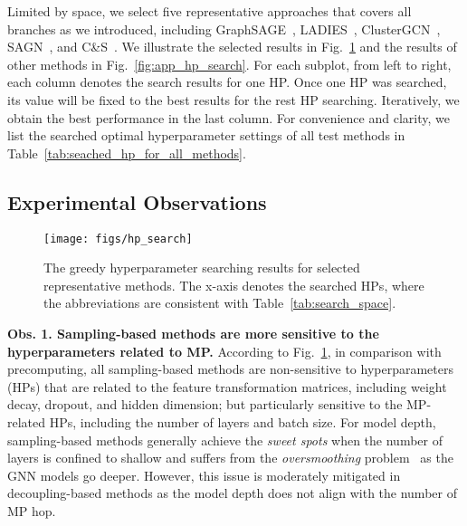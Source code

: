 \message{ !name(main.tex)}\documentclass{article}
\begin{document}
Limited by space, we select five representative approaches that covers all branches as we introduced, including GraphSAGE~\cite{hamilton2017inductive}, LADIES~\cite{zou2019layer}, ClusterGCN~\cite{chiang2019cluster}, SAGN~\cite{sun2021scalable}, and C\&S~\cite{huang2020combining}. We illustrate the selected results in Fig.~\ref{fig:hp_search} and the results of other methods in Fig.~\ref{fig:app_hp_search}. For each subplot, from left to right, each column denotes the search results for one HP. Once one HP was searched, its value will be fixed to the best results for the rest HP searching. Iteratively, we obtain the best performance in the last column. For convenience and clarity, we list the searched optimal hyperparameter settings of all test methods in Table~\ref{tab:seached_hp_for_all_methods}.

\vspace{-2mm}
\subsection{Experimental Observations}
\begin{figure}[!ht]
	\vspace{-4mm}
	\begin{center}
		\texttt{[image: figs/hp\_search]}
	\end{center}
	\caption{The greedy hyperparameter searching results for selected representative methods. The x-axis denotes the searched HPs, where the abbreviations are consistent with Table~\ref{tab:search_space}.}
	\label{fig:hp_search}
\end{figure}

\textbf{Obs. 1. Sampling-based methods are more sensitive to the hyperparameters related to MP.} According to Fig.~\ref{fig:hp_search}, in comparison with precomputing, all sampling-based methods are non-sensitive to hyperparameters (HPs) that are related to the feature transformation matrices, including weight decay, dropout, and hidden dimension; but particularly sensitive to the MP-related HPs, including the number of layers and batch size. For model depth, sampling-based methods generally achieve the \textit{sweet spots} when the number of layers is confined to shallow and suffers from the \textit{oversmoothing} problem~\cite{li2018deeper, chen2022bag, oono2020graph, zhou2020towards, zhou2021dirichlet} as the GNN models go deeper. However, this issue is moderately mitigated in decoupling-based methods as the model depth does not align with the number of MP hop.
\end{document}
